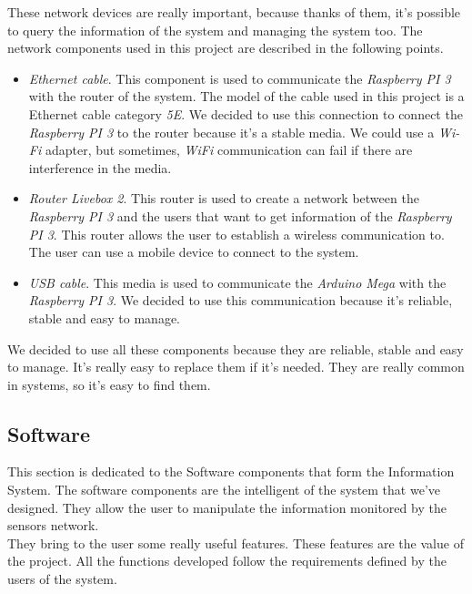 These network devices are really important, because thanks of them, it's possible to query the information of the system and managing the system too. The network components used in this project are described in the following points.\\

\begin{itemize}

\item \textit{Ethernet cable}. This component is used to communicate the \textit{Raspberry PI 3} with the router of the system. The model of the cable used in this project is a Ethernet cable category \textit{5E}. We decided to use this connection to connect the \textit{Raspberry PI 3} to the router because it's a stable media. We could use a \textit{Wi-Fi} adapter, but sometimes, \textit{WiFi} communication can fail if there are interference in the media.

\item \textit{Router Livebox 2}. This router is used to create a network between the \textit{Raspberry PI 3} and the users that want to get information of the \textit{Raspberry PI 3}. This router allows the user to establish a wireless communication to. The user can use a mobile device to connect to the system.

\item \textit{USB cable}. This media is used to communicate the \textit{Arduino Mega} with the \textit{Raspberry PI 3}. We decided to use this communication because it's reliable, stable and easy to manage.

\end{itemize}

We decided to use all these components because they are reliable, stable and easy to manage. It's really easy to  replace them if it's needed. They are really common in systems, so it's easy to find them.

\subsection{Software}

This section is dedicated to the Software components that form the Information System. The software components are the intelligent of the system that we've designed. They allow the user to manipulate the information monitored by the sensors network.\\

They bring to the user some really useful features. These features are the value of the project. All the functions developed follow the requirements defined by the users of the system.\\

